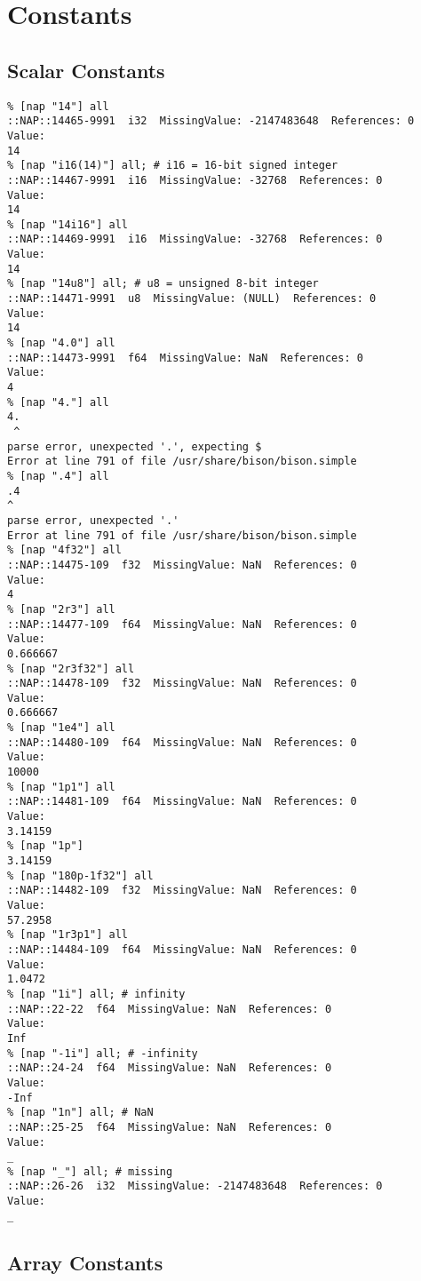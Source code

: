 
\section{Constants}

\subsection{Scalar Constants}

    \begin{verbatim}
% [nap "14"] all
::NAP::14465-9991  i32  MissingValue: -2147483648  References: 0
Value:
14
% [nap "i16(14)"] all; # i16 = 16-bit signed integer
::NAP::14467-9991  i16  MissingValue: -32768  References: 0
Value:
14
% [nap "14i16"] all
::NAP::14469-9991  i16  MissingValue: -32768  References: 0
Value:
14
% [nap "14u8"] all; # u8 = unsigned 8-bit integer
::NAP::14471-9991  u8  MissingValue: (NULL)  References: 0
Value:
14
% [nap "4.0"] all
::NAP::14473-9991  f64  MissingValue: NaN  References: 0
Value:
4
% [nap "4."] all
4.
 ^
parse error, unexpected '.', expecting $
Error at line 791 of file /usr/share/bison/bison.simple
% [nap ".4"] all
.4
^
parse error, unexpected '.'
Error at line 791 of file /usr/share/bison/bison.simple
% [nap "4f32"] all
::NAP::14475-109  f32  MissingValue: NaN  References: 0
Value:
4
% [nap "2r3"] all
::NAP::14477-109  f64  MissingValue: NaN  References: 0
Value:
0.666667
% [nap "2r3f32"] all
::NAP::14478-109  f32  MissingValue: NaN  References: 0
Value:
0.666667
% [nap "1e4"] all
::NAP::14480-109  f64  MissingValue: NaN  References: 0
Value:
10000
% [nap "1p1"] all
::NAP::14481-109  f64  MissingValue: NaN  References: 0
Value:
3.14159
% [nap "1p"]
3.14159
% [nap "180p-1f32"] all
::NAP::14482-109  f32  MissingValue: NaN  References: 0
Value:
57.2958
% [nap "1r3p1"] all
::NAP::14484-109  f64  MissingValue: NaN  References: 0
Value:
1.0472
% [nap "1i"] all; # infinity
::NAP::22-22  f64  MissingValue: NaN  References: 0
Value:
Inf
% [nap "-1i"] all; # -infinity
::NAP::24-24  f64  MissingValue: NaN  References: 0
Value:
-Inf
% [nap "1n"] all; # NaN
::NAP::25-25  f64  MissingValue: NaN  References: 0
Value:
_
% [nap "_"] all; # missing
::NAP::26-26  i32  MissingValue: -2147483648  References: 0
Value:
_
\end{verbatim}

\subsection{Array Constants}

